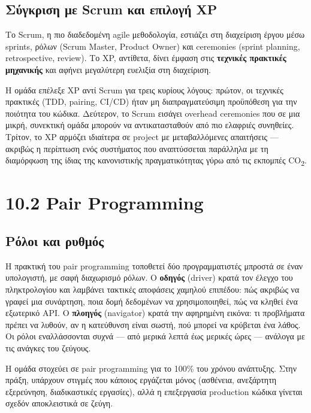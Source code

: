 \subsection{Σύγκριση με Scrum και επιλογή
XP}\label{ux3c3ux3cdux3b3ux3baux3c1ux3b9ux3c3ux3b7-ux3bcux3b5-scrum-ux3baux3b1ux3b9-ux3b5ux3c0ux3b9ux3bbux3bfux3b3ux3ae-xp}

Το Scrum, η πιο διαδεδομένη agile μεθοδολογία, εστιάζει στη διαχείριση
έργου μέσω sprints, ρόλων (Scrum Master, Product Owner) και ceremonies
(sprint planning, retrospective, review). Το XP, αντίθετα, δίνει έμφαση
στις \textbf{τεχνικές πρακτικές μηχανικής} και αφήνει μεγαλύτερη
ευελιξία στη διαχείριση.

Η ομάδα επέλεξε XP αντί Scrum για τρεις κυρίους λόγους: πρώτον, οι
τεχνικές πρακτικές (TDD, pairing, CI/CD) ήταν μη διαπραγματεύσιμη
προϋπόθεση για την ποιότητα του κώδικα. Δεύτερον, το Scrum εισάγει
overhead ceremonies που σε μια μικρή, συνεκτική ομάδα μπορούν να
αντικατασταθούν από πιο ελαφριές συνηθείες. Τρίτον, το XP αρμόζει
ιδιαίτερα σε project με μεταβαλλόμενες απαιτήσεις --- ακριβώς η
περίπτωση ενός συστήματος που αναπτύσσεται παράλληλα με τη διαμόρφωση
της ίδιας της κανονιστικής πραγματικότητας γύρω από τις εκπομπές
CO\textsubscript{2}.

\section{10.2 Pair Programming}\label{pair-programming}

\subsection{Ρόλοι και
ρυθμός}\label{ux3c1ux3ccux3bbux3bfux3b9-ux3baux3b1ux3b9-ux3c1ux3c5ux3b8ux3bcux3ccux3c2}

Η πρακτική του pair programming τοποθετεί δύο προγραμματιστές μπροστά σε
έναν υπολογιστή, με σαφή διαχωρισμό ρόλων. Ο \textbf{οδηγός} (driver)
κρατά τον έλεγχο του πληκτρολογίου και λαμβάνει τακτικές αποφάσεις
χαμηλού επιπέδου: πώς ακριβώς να γραφεί μια συνάρτηση, ποια δομή
δεδομένων να χρησιμοποιηθεί, πώς να κληθεί ένα εξωτερικό API. Ο
\textbf{πλοηγός} (navigator) κρατά την αφηρημένη εικόνα: τι προβλήματα
πρέπει να λυθούν, αν η κατεύθυνση είναι σωστή, πού μπορεί να κρύβεται
ένα λάθος. Οι ρόλοι εναλλάσσονται συχνά --- από μερικά λεπτά έως μερικές
ώρες --- ανάλογα με τις ανάγκες του ζεύγους.

Η ομάδα στοχεύει σε pair programming για το 100\% του χρόνου ανάπτυξης.
Στην πράξη, υπάρχουν στιγμές που κάποιος εργάζεται μόνος (ασθένεια,
ανεξάρτητη εξερεύνηση, διαδικαστικές εργασίες), αλλά η επεξεργασία
production κώδικα γίνεται σχεδόν αποκλειστικά σε ζεύγη.

